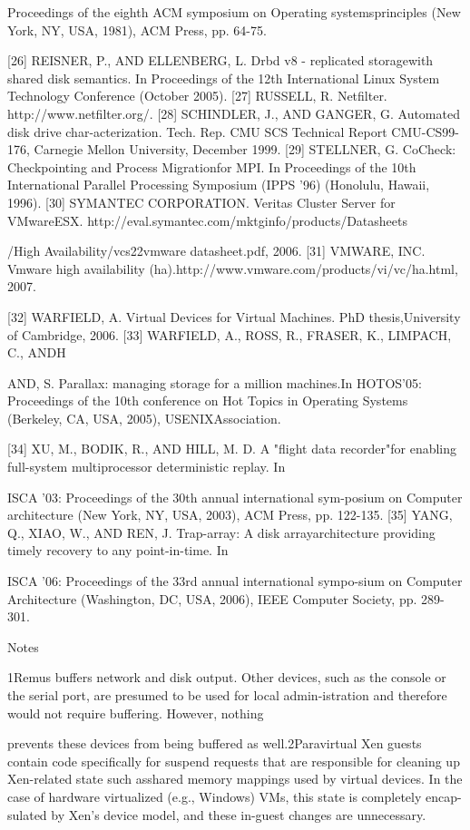 Proceedings of the eighth ACM symposium on Operating systemsprinciples (New York, NY, USA, 1981), ACM Press, pp. 64-75.

[26] REISNER, P., AND ELLENBERG, L. Drbd v8 - replicated storagewith shared disk semantics. In Proceedings of the 12th International Linux System Technology Conference (October 2005).
[27] RUSSELL, R. Netfilter. http://www.netfilter.org/.
[28] SCHINDLER, J., AND GANGER, G. Automated disk drive char-acterization. Tech. Rep. CMU SCS Technical Report CMU-CS99-176, Carnegie Mellon University, December 1999.
[29] STELLNER, G. CoCheck: Checkpointing and Process Migrationfor MPI. In Proceedings of the 10th International Parallel Processing Symposium (IPPS '96) (Honolulu, Hawaii, 1996).
[30] SYMANTEC CORPORATION. Veritas Cluster Server for VMwareESX. http://eval.symantec.com/mktginfo/products/Datasheets

/High Availability/vcs22vmware datasheet.pdf, 2006.
[31] VMWARE, INC. Vmware high availability (ha).http://www.vmware.com/products/vi/vc/ha.html, 2007.

[32] WARFIELD, A. Virtual Devices for Virtual Machines. PhD thesis,University of Cambridge, 2006.
[33] WARFIELD, A., ROSS, R., FRASER, K., LIMPACH, C., ANDH

AND, S. Parallax: managing storage for a million machines.In HOTOS'05: Proceedings of the 10th conference on Hot Topics in Operating Systems (Berkeley, CA, USA, 2005), USENIXAssociation.

[34] XU, M., BODIK, R., AND HILL, M. D. A "flight data recorder"for enabling full-system multiprocessor deterministic replay. In

ISCA '03: Proceedings of the 30th annual international sym-posium on Computer architecture (New York, NY, USA, 2003),
ACM Press, pp. 122-135.
[35] YANG, Q., XIAO, W., AND REN, J. Trap-array: A disk arrayarchitecture providing timely recovery to any point-in-time. In

ISCA '06: Proceedings of the 33rd annual international sympo-sium on Computer Architecture (Washington, DC, USA, 2006),
IEEE Computer Society, pp. 289-301.

Notes

1Remus buffers network and disk output. Other devices, such as
the console or the serial port, are presumed to be used for local admin-istration and therefore would not require buffering. However, nothing

prevents these devices from being buffered as well.2Paravirtual Xen guests contain code specifically for suspend requests that are responsible for cleaning up Xen-related state such asshared memory mappings used by virtual devices. In the case of hardware virtualized (e.g., Windows) VMs, this state is completely encap-sulated by Xen's device model, and these in-guest changes are unnecessary.